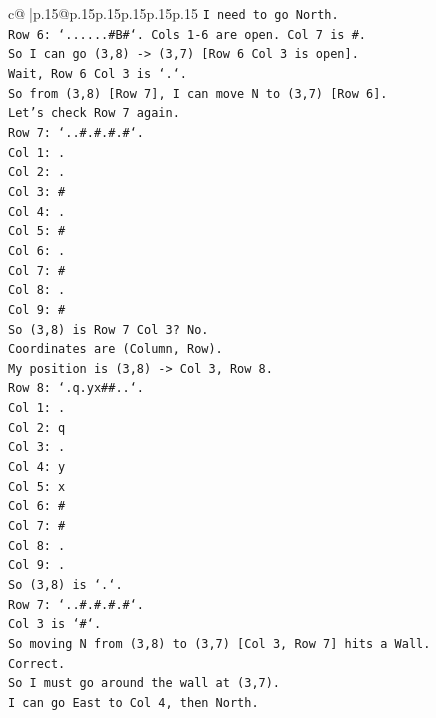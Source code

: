 \documentclass{article}
\begin{document}
{\begin{supertabular}{c@{$\;$}|p{.15\linewidth}@{}p{.15\linewidth}p{.15\linewidth}p{.15\linewidth}p{.15\linewidth}p{.15\linewidth}}
{{{\texttt{I need to go North.} \\
\texttt{Row 6: `......\#B\#`. Cols 1{-}6 are open. Col 7 is \#.} \\
\texttt{So I can go (3,8) {-}> (3,7) {[}Row 6 Col 3 is open{]}.} \\
\texttt{Wait, Row 6 Col 3 is `.`.} \\
\texttt{So from (3,8) {[}Row 7{]}, I can move N to (3,7) {[}Row 6{]}.} \\
\texttt{Let's check Row 7 again.} \\
\texttt{Row 7: `..\#.\#.\#.\#`.} \\
\texttt{Col 1: .} \\
\texttt{Col 2: .} \\
\texttt{Col 3: \#} \\
\texttt{Col 4: .} \\
\texttt{Col 5: \#} \\
\texttt{Col 6: .} \\
\texttt{Col 7: \#} \\
\texttt{Col 8: .} \\
\texttt{Col 9: \#} \\
\texttt{So (3,8) is Row 7 Col 3? No.} \\
\texttt{Coordinates are (Column, Row).} \\
\texttt{My position is (3,8) {-}> Col 3, Row 8.} \\
\texttt{Row 8: `.q.yx\#\#..`.} \\
\texttt{Col 1: .} \\
\texttt{Col 2: q} \\
\texttt{Col 3: .} \\
\texttt{Col 4: y} \\
\texttt{Col 5: x} \\
\texttt{Col 6: \#} \\
\texttt{Col 7: \#} \\
\texttt{Col 8: .} \\
\texttt{Col 9: .} \\
\texttt{So (3,8) is `.`.} \\
\texttt{Row 7: `..\#.\#.\#.\#`.} \\
\texttt{Col 3 is `\#`.} \\
\texttt{So moving N from (3,8) to (3,7) {[}Col 3, Row 7{]} hits a Wall.} \\
\texttt{Correct.} \\
\texttt{So I must go around the wall at (3,7).} \\
\texttt{I can go East to Col 4, then North.} \\
}}}
\end{supertabular}}
\end{document}
